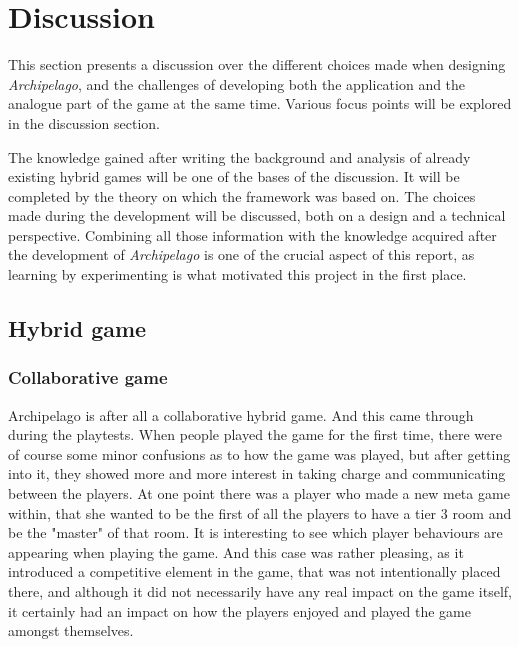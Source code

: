 \chapter{Discussion}
\label{sec:disc}
This section presents a discussion over the different choices made when designing \textit{Archipelago}, and the challenges of developing both the application and the analogue part of the game at the same time. Various focus points will be explored in the discussion section. 

The knowledge gained after writing the background and analysis of already existing hybrid games will be one of the bases of the discussion. It will be completed by the theory on which the framework was based on. The choices made during the development will be discussed, both on a design and a technical perspective. Combining all those information with the knowledge acquired after the development of \textit{Archipelago} is one of the crucial aspect of this report, as learning by experimenting is what motivated this project in the first place.

\section{Hybrid game}
\subsection{Collaborative game} 
Archipelago is after all a collaborative hybrid game. And this came through during the playtests. When people played the game for the first time, there were of course some minor confusions as to how the game was played, but after getting into it, they showed more and more interest in taking charge and communicating between the players. At one point there was a player who made a new meta game within, that she wanted to be the first of all the players to have a tier 3 room and be the "master" of that room. It is interesting to see which player behaviours are appearing when playing the game. And this case was rather pleasing, as it introduced a competitive element in the game, that was not intentionally placed there, and although it did not necessarily have any real impact on the game itself, it certainly had an impact on how the players enjoyed and played the game amongst themselves.

